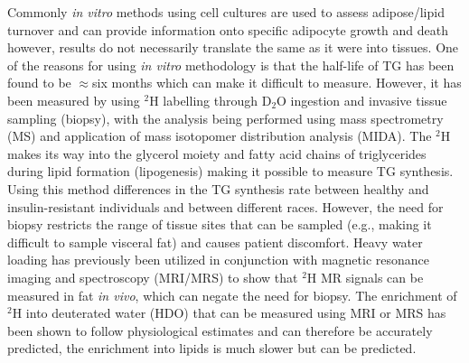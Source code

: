 \documentclass[class=article, crop=false]{standalone}
\begin{document}
Commonly \textit{in vitro} methods using cell cultures are used to assess adipose/lipid turnover and can provide information onto specific adipocyte growth and death\cite{Tchkonia2002FatPreadipocytes} however, results do not necessarily translate the same as it were into tissues. One of the reasons for using \textit{in vitro} methodology is that the half-life of TG has been found to be $\approx$six months\cite{Strawford2004AdiposeO} which can make it difficult to measure. However, it has been measured by using $^2$H labelling through D$_2$O ingestion and invasive tissue sampling (biopsy), with the analysis being performed using mass spectrometry (MS) and application of mass isotopomer distribution analysis (MIDA)\cite{White2019DynamicsDisease, Strawford2004AdiposeO, Belew2022DeTracers, Turner2003MeasurementMIDA}. The $^2$H makes its way into the glycerol moiety and fatty acid chains of triglycerides during lipid formation (lipogenesis) making it possible to measure TG synthesis\cite{Turner2003MeasurementMIDA}. Using this method differences in the TG synthesis rate between healthy and insulin-resistant individuals\cite{Allister2015InHumans} and between different races\cite{White2018RacialHumans}. However, the need for biopsy restricts the range of tissue sites that can be sampled (e.g., making it difficult to sample visceral fat) and causes patient discomfort. Heavy water loading has previously been utilized in conjunction with magnetic resonance imaging and spectroscopy (MRI/MRS) to show that $^2$H MR signals can be measured in fat \textit{in vivo}\cite{Brereton1989TheMice, Cocking2023DeuteriumDosing}, which can negate the need for biopsy. The enrichment of $^2$H into deuterated water (HDO) that can be measured using MRI or MRS has been shown to follow physiological estimates and can therefore be accurately predicted\cite{Cocking2023DeuteriumDosing}, the enrichment into lipids is much slower\cite{White2019DynamicsDisease, Strawford2004AdiposeO} but can be predicted\cite{White2019DynamicsDisease}.
\end{document}
